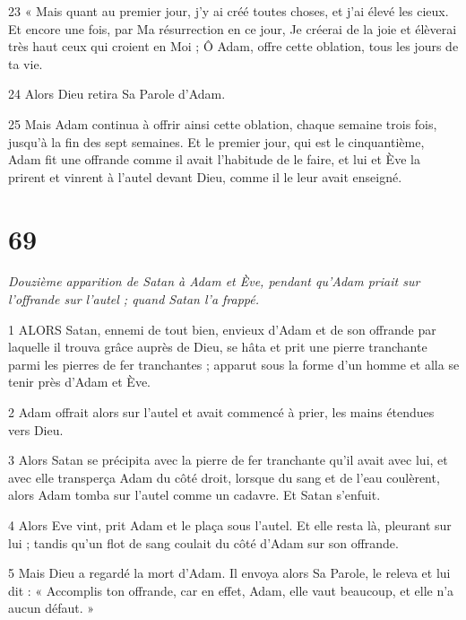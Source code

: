 \par 23 « Mais quant au premier jour, j'y ai créé toutes choses, et j'ai élevé les cieux. Et encore une fois, par Ma résurrection en ce jour, Je créerai de la joie et élèverai très haut ceux qui croient en Moi ; Ô Adam, offre cette oblation, tous les jours de ta vie.

\par 24 Alors Dieu retira Sa Parole d'Adam.

\par 25 Mais Adam continua à offrir ainsi cette oblation, chaque semaine trois fois, jusqu'à la fin des sept semaines. Et le premier jour, qui est le cinquantième, Adam fit une offrande comme il avait l'habitude de le faire, et lui et Ève la prirent et vinrent à l'autel devant Dieu, comme il le leur avait enseigné.



\chapter{69}

\par \textit{Douzième apparition de Satan à Adam et Ève, pendant qu'Adam priait sur l'offrande sur l'autel ; quand Satan l'a frappé.}

\par 1 ALORS Satan, ennemi de tout bien, envieux d'Adam et de son offrande par laquelle il trouva grâce auprès de Dieu, se hâta et prit une pierre tranchante parmi les pierres de fer tranchantes ; apparut sous la forme d'un homme et alla se tenir près d'Adam et Ève.

\par 2 Adam offrait alors sur l'autel et avait commencé à prier, les mains étendues vers Dieu.

\par 3 Alors Satan se précipita avec la pierre de fer tranchante qu'il avait avec lui, et avec elle transperça Adam du côté droit, lorsque du sang et de l'eau coulèrent, alors Adam tomba sur l'autel comme un cadavre. Et Satan s'enfuit.

\par 4 Alors Eve vint, prit Adam et le plaça sous l'autel. Et elle resta là, pleurant sur lui ; tandis qu'un flot de sang coulait du côté d'Adam sur son offrande.

\par 5 Mais Dieu a regardé la mort d'Adam. Il envoya alors Sa Parole, le releva et lui dit : « Accomplis ton offrande, car en effet, Adam, elle vaut beaucoup, et elle n'a aucun défaut. »

